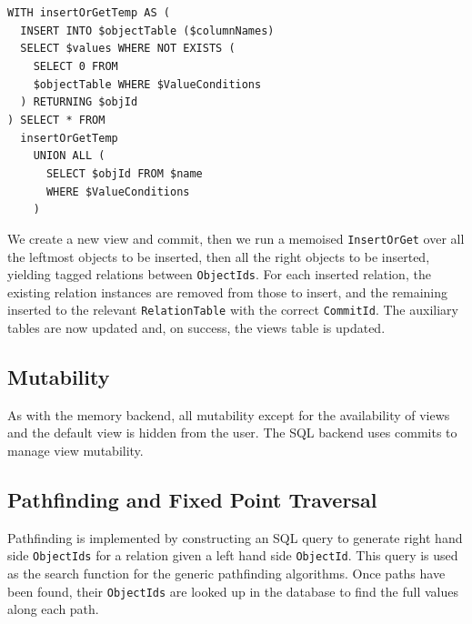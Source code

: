 \documentclass[12pt,a4paper,twoside,openright]{report}
\newcommand\codeName[1]{\texttt{#1}}
\begin{document}
\begin{framed}
\noindent
\mbox{\texttt{WITH insertOrGetTemp AS (}}\\
\mbox{\texttt{~~INSERT INTO \$objectTable (\$columnNames)}}\\
\mbox{\texttt{~~SELECT \$values WHERE NOT EXISTS (}}\\
\mbox{\texttt{~~~~SELECT 0 FROM }}\\
\mbox{\texttt{~~~~\$objectTable WHERE \$ValueConditions}}\\
\mbox{\texttt{~~) RETURNING \$objId}}\\
\mbox{\texttt{) SELECT * FROM}}\\
\mbox{\texttt{~~insertOrGetTemp  }}\\
\mbox{\texttt{~~~~UNION ALL (}}\\
\mbox{\texttt{~~~~~~SELECT \$objId FROM \$name}}\\
\mbox{\texttt{~~~~~~WHERE \$ValueConditions}}\\
\mbox{\texttt{~~~~)}}\\
\end{framed}
	
	We create a new view and commit, then we run a memoised \codeName{InsertOrGet} over all the leftmost objects to be inserted, then all the right objects to be inserted, yielding tagged relations between \codeName{ObjectIds}. For each inserted relation, the existing relation instances are removed from those to insert, and the remaining inserted to the relevant \codeName{RelationTable} with the correct \codeName{CommitId}. The auxiliary tables are now updated and, on success, the views table is updated.

	\subsection{Mutability}
	As with the memory backend, all mutability except for the availability of views and the default view is hidden from the user. The SQL backend uses commits to manage view mutability.
	\subsection{Pathfinding and Fixed Point Traversal}
Pathfinding is implemented by constructing an SQL query to generate right hand side \codeName{ObjectIds} for a relation given a left hand side \codeName{ObjectId}. This query is used as the search function for the generic pathfinding algorithms. Once paths have been found, their \codeName{ObjectIds} are looked up in the database to find the full values along each path.
\end{document}
